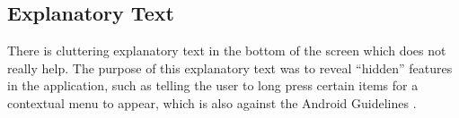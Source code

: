 \subsection{Explanatory Text}

There is cluttering explanatory text in the bottom of the screen which does not really help. The purpose of this explanatory text was to reveal ``hidden'' features in the application, such as telling the user to long press certain items for a contextual menu to appear, which is also against the Android Guidelines \parencite{android_guidelines_longpress}.
